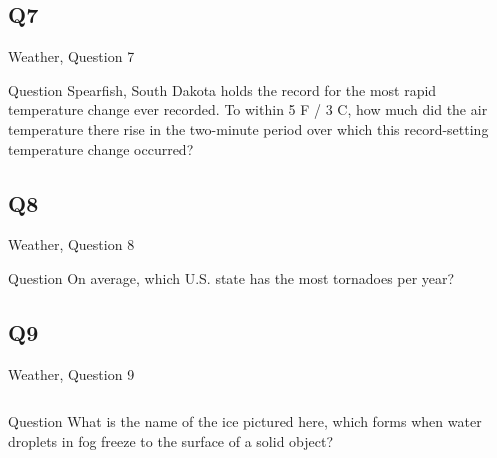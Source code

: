 \documentclass[11pt]{beamer}
\begin{document}
\subsection*{Q7}
\begin{frame}[t]{Weather, Question 7}
\begin{block}{Question}
Spearfish, South Dakota holds the record for the most rapid temperature change ever recorded. To within 5 \textdegree{}F / 3 \textdegree{}C, how much did the air temperature there rise in the two-minute period over which this record-setting temperature change occurred?
\end{block}
\end{frame}
\subsection*{Q8}
\begin{frame}[t]{Weather, Question 8}
\begin{block}{Question}
On average, which U.S. state has the most tornadoes per year?
\end{block}
\end{frame}
\subsection*{Q9}
\begin{frame}[t]{Weather, Question 9}
\begin{columns}[T,totalwidth=\linewidth]
\begin{column}{0.32\linewidth}
\begin{block}{Question}
What is the name of the ice pictured here, which forms when water droplets in fog freeze to the surface of a solid object?
\end{block}
\end{column}
\begin{column}{0.65\linewidth}
\begin{center}
\texttt{[image: \{Images/rime]}.jpg}
\end{center}
\end{column}
\end{columns}
\end{frame}
\end{document}
